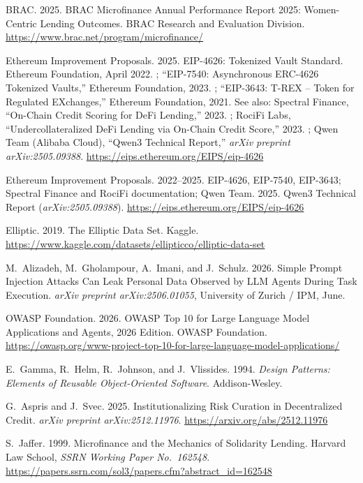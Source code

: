 \documentclass[12pt,a4paper]{report}
\begin{document}
{\begin{enumerate}[label={[\arabic*]}]
\item BRAC. 2025. BRAC Microfinance Annual Performance Report 2025: Women-Centric Lending Outcomes. BRAC Research and Evaluation Division. \url{https://www.brac.net/program/microfinance/}


\item Ethereum Improvement Proposals. 2025. EIP-4626: Tokenized Vault Standard. Ethereum Foundation, April 2022. ; ``EIP-7540: Asynchronous ERC-4626 Tokenized Vaults,'' Ethereum Foundation, 2023. ; ``EIP-3643: T-REX -- Token for Regulated EXchanges,'' Ethereum Foundation, 2021.  See also: Spectral Finance, ``On-Chain Credit Scoring for DeFi Lending,'' 2023. ; RociFi Labs, ``Undercollateralized DeFi Lending via On-Chain Credit Score,'' 2023. ; Qwen Team (Alibaba Cloud), ``Qwen3 Technical Report,'' \emph{arXiv preprint arXiv:2505.09388}. \url{https://eips.ethereum.org/EIPS/eip-4626}


\item Ethereum Improvement Proposals. 2022--2025. EIP-4626, EIP-7540, EIP-3643; Spectral Finance and RociFi documentation; Qwen Team. 2025. Qwen3 Technical Report (\emph{arXiv:2505.09388}). \url{https://eips.ethereum.org/EIPS/eip-4626}


\item Elliptic. 2019. The Elliptic Data Set. Kaggle. \url{https://www.kaggle.com/datasets/ellipticco/elliptic-data-set}


\item M.~Alizadeh, M.~Gholampour, A.~Imani, and J.~Schulz. 2026. Simple Prompt Injection Attacks Can Leak Personal Data Observed by LLM Agents During Task Execution. \emph{arXiv preprint arXiv:2506.01055}, University of Zurich / IPM, June.


\item OWASP Foundation. 2026. OWASP Top 10 for Large Language Model Applications and Agents, 2026 Edition. OWASP Foundation. \url{https://owasp.org/www-project-top-10-for-large-language-model-applications/}


\item E.~Gamma, R.~Helm, R.~Johnson, and J.~Vlissides. 1994. \emph{Design Patterns: Elements of Reusable Object-Oriented Software}. Addison-Wesley.


\item G.~Aspris and J.~Svec. 2025. Institutionalizing Risk Curation in Decentralized Credit. \emph{arXiv preprint arXiv:2512.11976}. \url{https://arxiv.org/abs/2512.11976}


\item S.~Jaffer. 1999. Microfinance and the Mechanics of Solidarity Lending. Harvard Law School, \emph{SSRN Working Paper No.~162548}. \url{https://papers.ssrn.com/sol3/papers.cfm?abstract_id=162548}



\end{enumerate}}
\end{document}
